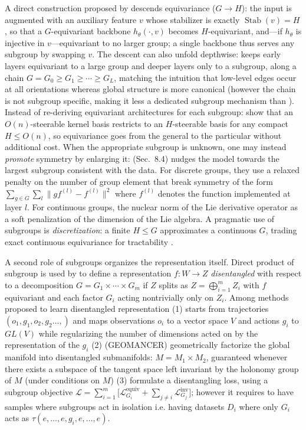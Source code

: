 \documentclass[mathematics,review,submit,moreauthors]{Definitions/mdpi}
\begin{document}
A direct construction proposed by \citet{goel2025} descends equivariance ($G\to H$): the input is augmented with an auxiliary feature $v$ whose stabilizer is exactly $\operatorname{Stab}(v)=H$, so that a $G$-equivariant backbone $h_\theta(\cdot,v)$ becomes $H$-equivariant, and---if $h_\theta$ is injective in $v$---equivariant to no larger group; a single backbone thus serves any subgroup by swapping $v$.
The descent can also unfold depthwise: \citet{weiler2019anips} keeps early layers equivariant to a large group and deeper layers only to a subgroup, along a chain $G=G_0\ge G_1\ge\cdots\ge G_L$, matching the intuition that low-level edges occur at all orientations whereas global structure is more canonical (however the chain is not subgroup specific, making it less a dedicated subgroup mechanism than \citep{goel2025}).
Instead of re-deriving equivariant architectures for each subgroup: \citet{cesa2021} show that an $O(n)$-steerable kernel basis restricts to an $H$-steerable basis for any compact $H\le O(n)$, so equivariance goes from the general to the particular without additional cost.
When the appropriate subgroup is unknown, one may instead \emph{promote} symmetry by enlarging it: \citet{otto2025} (Sec.~8.4) nudges the model towards the largest subgroup consistent with the data.
For discrete groups, they use a relaxed penalty on the number of group element that break symmetry of the form $\sum_{g\in G} \sum_l \| g f^{(l)} - f^{(l)}\|^2$ where $f^{(l)}$ denotes the function implemented at layer $l$.
For continuous groups, the nuclear norm of the Lie derivative operator as a soft penalization of the dimension of the Lie algebra.
A pragmatic use of subgroups is \emph{discretization}: a finite $H\le G$ approximates a continuous $G$, trading exact continuous equivariance for tractability \citep{cohen2016,worrall2018cv-e21ecmgs82ppv,ali2026}.

A second role of subgroups organizes the representation itself.
Direct product of subgroup is used by \citet{higgins2018} to define a representation $f\colon W\to Z$ \emph{disentangled} with respect to a decomposition $G=G_1\times\cdots\times G_m$ if $Z$ splits as $Z=\bigoplus_{i=1}^m Z_i$ with $f$ equivariant and each factor $G_i$ acting nontrivially only on $Z_i$.
Among methods proposed to learn disentangled representation (1) \citet{quessard2020anips} starts from trajectories $(o_1, g_1, o_2, g_2 \dots, )$ and maps observations $o_i$ to a vector space $V$ and actions $g_i$ to $GL(V)$ while regularizing the number of dimensions acted on by the representation of the $g_i$ (2) \citet{pfau2020anips} (GEOMANCER) geometrically factorize the global manifold into disentangled submanifolds: $M=M_1\times M_2$, guaranteed whenever there exists a subspace of the tangent space left invariant by the holonomy group of $M$ (under conditions on $M$) (3) \citet{shakerinava2022anips} formulate a disentangling loss, using a subgroup objective $\mathcal{L}=\sum_{i=1}^{m} \big[\mathcal{L}_{G_i}^{\mathrm{equiv}} + \sum_{j\neq i} \mathcal{L}_{G_j}^{\mathrm{inv}}\big]$; however it requires to have samples where subgroups act in isolation i.e. having datasets $D_i$ where only $G_i$ acts as $\tau (e, \dots, e, g_i, e, \dots, e)$.
\end{document}

